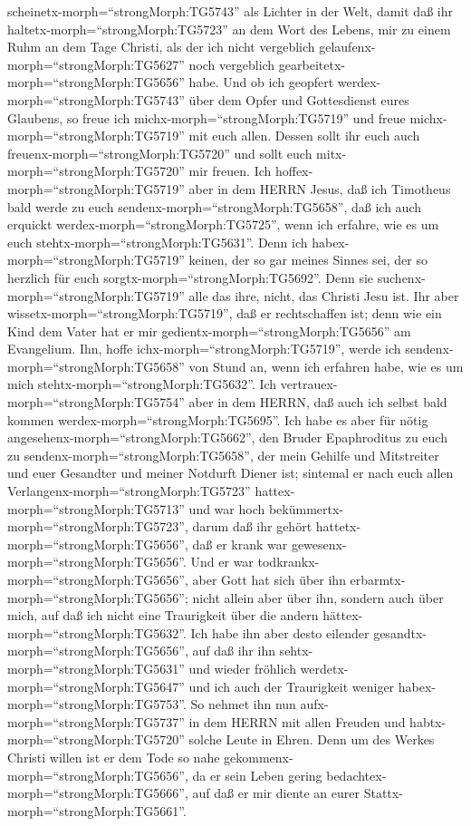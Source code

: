 scheinetx-morph=``strongMorph:TG5743'' als Lichter in der Welt,
 damit daß ihr haltetx-morph=``strongMorph:TG5723'' an dem
Wort des Lebens, mir zu einem Ruhm an dem Tage Christi, als der ich
nicht vergeblich gelaufenx-morph=``strongMorph:TG5627'' noch vergeblich
gearbeitetx-morph=``strongMorph:TG5656'' habe.  Und ob ich
geopfert werdex-morph=``strongMorph:TG5743'' über dem Opfer und
Gottesdienst eures Glaubens, so freue ich
michx-morph=``strongMorph:TG5719'' und freue
michx-morph=``strongMorph:TG5719'' mit euch allen.  Dessen
sollt ihr euch auch freuenx-morph=``strongMorph:TG5720'' und sollt euch
mitx-morph=``strongMorph:TG5720'' mir freuen.  Ich
hoffex-morph=``strongMorph:TG5719'' aber in dem HERRN Jesus, daß ich
Timotheus bald werde zu euch sendenx-morph=``strongMorph:TG5658'', daß
ich auch erquickt werdex-morph=``strongMorph:TG5725'', wenn ich erfahre,
wie es um euch stehtx-morph=``strongMorph:TG5631''.  Denn
ich habex-morph=``strongMorph:TG5719'' keinen, der so gar meines Sinnes
sei, der so herzlich für euch sorgtx-morph=``strongMorph:TG5692''.
 Denn sie suchenx-morph=``strongMorph:TG5719'' alle das
ihre, nicht, das Christi Jesu ist.  Ihr aber
wissetx-morph=``strongMorph:TG5719'', daß er rechtschaffen ist; denn wie
ein Kind dem Vater hat er mir gedientx-morph=``strongMorph:TG5656'' am
Evangelium.  Ihn, hoffe ichx-morph=``strongMorph:TG5719'',
werde ich sendenx-morph=``strongMorph:TG5658'' von Stund an, wenn ich
erfahren habe, wie es um mich stehtx-morph=``strongMorph:TG5632''.
 Ich vertrauex-morph=``strongMorph:TG5754'' aber in dem
HERRN, daß auch ich selbst bald kommen
werdex-morph=``strongMorph:TG5695''.  Ich habe es aber für
nötig angesehenx-morph=``strongMorph:TG5662'', den Bruder Epaphroditus
zu euch zu sendenx-morph=``strongMorph:TG5658'', der mein Gehilfe und
Mitstreiter und euer Gesandter und meiner Notdurft Diener ist;
 sintemal er nach euch allen
Verlangenx-morph=``strongMorph:TG5723''
hattex-morph=``strongMorph:TG5713'' und war hoch
bekümmertx-morph=``strongMorph:TG5723'', darum daß ihr gehört
hattetx-morph=``strongMorph:TG5656'', daß er krank war
gewesenx-morph=``strongMorph:TG5656''.  Und er war
todkrankx-morph=``strongMorph:TG5656'', aber Gott hat sich über ihn
erbarmtx-morph=``strongMorph:TG5656''; nicht allein aber über ihn,
sondern auch über mich, auf daß ich nicht eine Traurigkeit über die
andern hättex-morph=``strongMorph:TG5632''.  Ich habe ihn
aber desto eilender gesandtx-morph=``strongMorph:TG5656'', auf daß ihr
ihn sehtx-morph=``strongMorph:TG5631'' und wieder fröhlich
werdetx-morph=``strongMorph:TG5647'' und ich auch der Traurigkeit
weniger habex-morph=``strongMorph:TG5753''.  So nehmet ihn
nun aufx-morph=``strongMorph:TG5737'' in dem HERRN mit allen Freuden und
habtx-morph=``strongMorph:TG5720'' solche Leute in Ehren. 
Denn um des Werkes Christi willen ist er dem Tode so nahe
gekommenx-morph=``strongMorph:TG5656'', da er sein Leben gering
bedachtex-morph=``strongMorph:TG5666'', auf daß er mir diente an eurer
Stattx-morph=``strongMorph:TG5661''.

